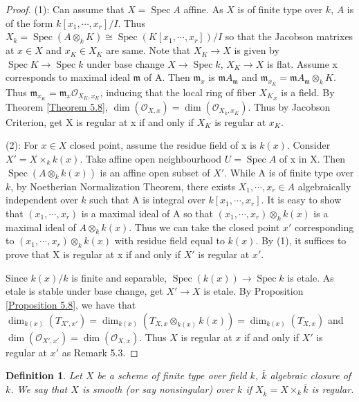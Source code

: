 \documentclass{ctexart}
\newtheorem{definition}{Definition}[section]
\newcommand{\spec}{\operatorname{Spec}}
\begin{document}
\begin{proof}
    (1): Can assume that $X = \spec A$ affine.
    As $X$ is of finite type over $k$, $A$ is of the form $k[x_{1}, \cdots, x_{r}]/I$.
    Thus $X_{k} = \spec(A \otimes_{k} K) \cong \spec(K[x_{1}, \cdots, x_{r}])/I$ so that the Jacobson matrixes at $x\in X$ and $x_{K}\in X_{K}$ are same.
    Note that $X_{K} \longrightarrow X$ is given by $\spec K \longrightarrow \spec k$ under base change $X \longrightarrow \spec k$, $X_{K} \longrightarrow X$ is flat.
    Assume x corresponds to maximal ideal $\mathfrak{m}$ of A.
    Then $\mathfrak{m}_{x}$ is $\mathfrak{m}A_{\mathfrak{m}}$ and $\mathfrak{m}_{x_{K}} = \mathfrak{m}A_{\mathfrak{m}} \otimes_{k} K$.
    Thus $\mathfrak{m}_{x_{K}} = \mathfrak{m}_{x}\mathcal{O}_{X_{K}, x_{K}}$, inducing that the local ring of fiber ${X_{K}}_{x}$ is a field.
    By Theorem \ref{Theorem 5.8}, $\dim(\mathcal{O}_{X, x}) = \dim(\mathcal{O}_{X_{k}, x_{K}})$.
    Thus by Jacobson Criterion, get X is regular at x if and only if $X_{K}$ is regular at $x_{K}$.
    \par
    (2): For $x\in X$ closed point, assume the residue field of x is $k(x)$.
    Consider $X' = X \times_{k} k(x)$.
    Take affine open neighbourhood $U = \spec A$ of x in X.
    Then $\spec(A \otimes_{k} k(x))$ is an affine open subset of $X'$.
    While A is of finite type over $k$, by Noetherian Normalization Theorem, there exists $X_{1}, \cdots, x_{r}\in A$ algebraically independent over $k$ such that A is integral over $k[x_{1}, \cdots, x_{r}]$.
    It is easy to show that $(x_{1}, \cdots, x_{r})$ is a maximal ideal of A so that $(x_{1}, \cdots, x_{r}) \otimes_{k} k(x)$ is a maximal ideal of $A \otimes_{k} k(x)$.
    Thus we can take the closed point $x'$ corresponding to $(x_{1}, \cdots, x_{r}) \otimes_{k} k(x)$ with residue field equal to $k(x)$.
    By (1), it suffices to prove that X is regular at x if and only if $X'$ is regular at $x'$.
    \par
    Since $k(x)/k$ is finite and separable, $\spec(k(x)) \longrightarrow \spec k$ is etale.
    As etale is stable under base change, get $X' \longrightarrow X$ is etale.
    By Proposition \ref{Proposition 5.8}, we have that $\dim_{k(x)}(T_{X', x'}) = \dim_{k(x)}(T_{X, x} \otimes_{k(x)} k(x)) = \dim_{k(x)}(T_{X, x})$ and $\dim(\mathcal{O}_{X', x'}) = \dim(\mathcal{O}_{X, x})$.
    Thus $X$ is regular at $x$ if and only if $X'$ is regular at $x'$ as Remark 5.3.
\end{proof}
\begin{definition}
    Let $X$ be a scheme of finite type over field $k$, $\overline{k}$ algebraic closure of $k$.
    We say that $X$ is smooth (or say nonsingular) over $k$ if $X_{\overline{k}} = X \times_{k} \overline{k}$ is regular.
\end{definition}
\end{document}

